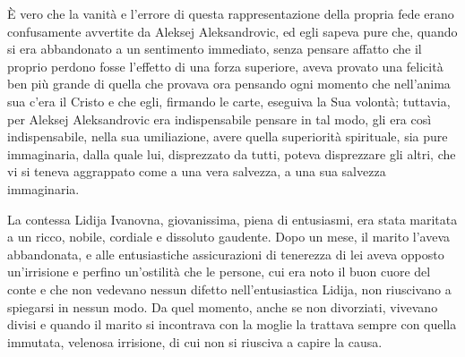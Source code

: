 È vero che la vanità e l'errore di questa rappresentazione della propria fede erano confusamente avvertite da Aleksej Aleksandrovic, ed egli sapeva pure che, quando si era abbandonato a un sentimento immediato, senza pensare affatto che il proprio perdono fosse l'effetto di una forza superiore, aveva provato una felicità ben più grande di quella che provava ora pensando ogni momento che nell'anima sua c'era il Cristo e che egli, firmando le carte, eseguiva la Sua volontà; tuttavia, per Aleksej Aleksandrovic era indispensabile pensare in tal modo, gli era così indispensabile, nella sua umiliazione, avere quella superiorità spirituale, sia pure immaginaria, dalla quale lui, disprezzato da tutti, poteva disprezzare gli altri, che vi si teneva aggrappato come a una vera salvezza, a una sua salvezza immaginaria. 

\label{xxiii-4} 

La contessa Lidija Ivanovna, giovanissima, piena di entusiasmi, era stata maritata a un ricco, nobile, cordiale e dissoluto gaudente. Dopo un mese, il marito l'aveva abbandonata, e alle entusiastiche assicurazioni di tenerezza di lei aveva opposto un'irrisione e perfino un'ostilità che le persone, cui era noto il buon cuore del conte e che non vedevano nessun difetto nell'entusiastica Lidija, non riuscivano a spiegarsi in nessun modo. Da quel momento, anche se non divorziati, vivevano divisi e quando il marito si incontrava con la moglie la trattava sempre con quella immutata, velenosa irrisione, di cui non si riusciva a capire la causa. 
\enlargethispage*{1\baselineskip}

